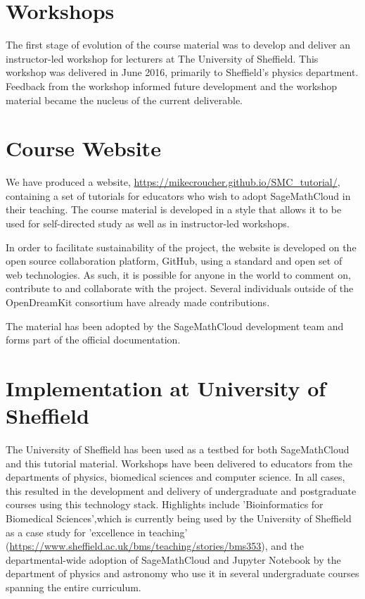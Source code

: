 \documentclass{deliverablereport}
\author{Mike Croucher and Tania Allard}
\begin{document}
\maketitle
%
\strut\githubissuedescription
\newpage\tableofcontents\newpage
\section{Workshops}
The first stage of evolution of the course material was to develop and deliver an instructor-led workshop for lecturers at The University of Sheffield.
This workshop was delivered in June 2016, primarily to Sheffield's physics department. Feedback from the workshop informed future development and the workshop material became the nucleus of the current deliverable.
\section{Course Website}
We have produced a website, \url{https://mikecroucher.github.io/SMC_tutorial/}, containing a set of tutorials for educators who wish to adopt SageMathCloud in their teaching. The course material is developed in a style that allows it to be used for self-directed study as well as in instructor-led workshops.

In order to facilitate sustainability of the project, the website is developed on the open source collaboration platform, GitHub, using a standard and open set of web technologies. As such, it is possible for anyone in the world to comment on, contribute to and collaborate with the project.
Several individuals outside of the OpenDreamKit consortium have already made contributions.

The material has been adopted by the SageMathCloud development team and forms part of the official documentation.
\section{Implementation at University of Sheffield}
The University of Sheffield has been used as a testbed for both SageMathCloud and this tutorial material. Workshops have been delivered to educators from the departments of physics, biomedical sciences and computer science. In all cases, this resulted in the development and delivery of undergraduate and postgraduate courses using this technology stack. Highlights include 'Bioinformatics for Biomedical Sciences',which is currently being used by the University of Sheffield as a case study for 'excellence in teaching' (\url{https://www.sheffield.ac.uk/bms/teaching/stories/bms353}), and the departmental-wide adoption of SageMathCloud and Jupyter Notebook by the department of physics and astronomy who use it in several undergraduate courses spanning the entire curriculum.
\end{document}

